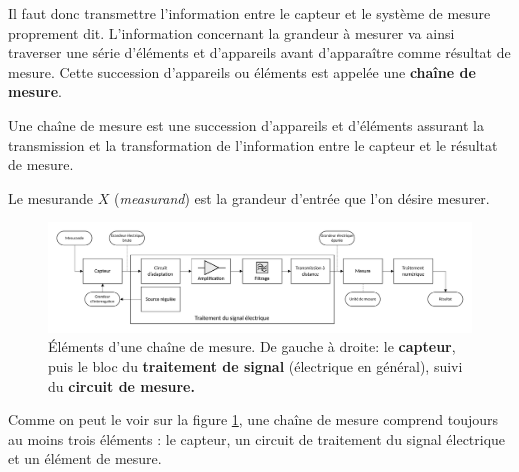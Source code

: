 \documentclass[main.tex]{subfiles}
\begin{document}
Il faut donc transmettre l'information entre le capteur et le système de mesure proprement dit. L'information concernant la grandeur à mesurer va ainsi traverser une série d'éléments et d'appareils avant d'apparaître comme résultat de mesure. Cette succession d'appareils ou éléments est appelée une \textbf{chaîne de mesure}.

\begin{definition}
    Une chaîne de mesure est une succession d'appareils et d'éléments assurant la transmission et la transformation de l'information entre le capteur et le résultat de mesure.
\end{definition}

\begin{definition}
    Le mesurande $X$ (\emph{measurand}) est la grandeur d'entrée que l'on désire mesurer.
\end{definition}

\begin{figure}[ht]
    \centering
    \vspace{-5mm}
    \includegraphics[width=\textwidth]{assets/figures/chaine-de-mesure.pdf}
    \caption{Éléments d'une chaîne de mesure. De gauche à droite: le \textbf{capteur}, puis le bloc du \textbf{traitement de signal} (électrique en général), suivi du \textbf{circuit de mesure.}}
    \label{fig:chaine_de_mesure}
\end{figure}
Comme on peut le voir sur la figure \ref{fig:chaine_de_mesure}, une chaîne de mesure comprend toujours au moins trois éléments : le capteur, un circuit de traitement du signal électrique et un élément de mesure.
\end{document}
